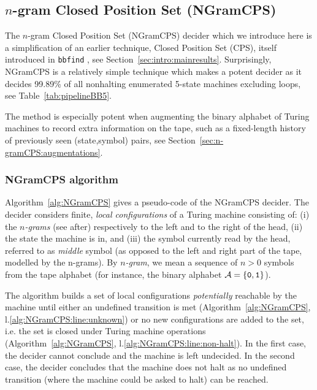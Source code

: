 
\newpage


\newcommand{\ngramcps}{NGramCPS\xspace}

\subsection{$n$-gram Closed Position Set (\ngramcps)}\label{sec:n-gramCPS}

The $n$-gram Closed Position Set (\ngramcps) decider which we introduce here is a simplification of an earlier technique, Closed Position Set (CPS), itself introduced in \texttt{bbfind} \cite{Skelet_bbfind}, see Section~\ref{sec:intro:mainresults}. Surprisingly, \ngramcps is a relatively simple technique which makes a potent decider as it decides 99.89\% of all nonhalting enumerated 5-state machines excluding loops, see Table~\ref{tab:pipelineBB5}.

The method is especially potent when augmenting the binary alphabet of Turing machines to record extra information on the tape, such as a fixed-length history of previously seen (state,symbol) pairs, see Section~\ref{sec:n-gramCPS:augmentations}.

\subsubsection{\ngramcps algorithm}\label{sec:n-gramCPS:algo}

Algorithm~\ref{alg:NGramCPS} gives a pseudo-code of the \ngramcps decider. The decider considers finite, \textit{local configurations} of a Turing machine consisting of: (i) the \textit{$n$-grams} (see after) respectively to the left and to the right of the head, (ii) the state the machine is in, and (iii) the symbol currently read by the head, referred to as \textit{middle} symbol (as opposed to the left and right part of the tape, modelled by the n-grams). By \textit{$n$-gram}, we mean a sequence of $n > 0$ symbols from the tape alphabet (for instance, the binary alphabet $\mathcal{A}=\{\texttt{0},\texttt{1}\}$).

The algorithm builds a set of local configurations \textit{potentially} reachable by the machine until either an undefined transition is met (Algorithm~\ref{alg:NGramCPS}, l.\ref{alg:NGramCPS:line:unknown}) or no new configurations are added to the set, i.e. the set is closed under Turing machine operations (Algorithm~\ref{alg:NGramCPS}, l.\ref{alg:NGramCPS:line:non-halt}). In the first case, the decider cannot conclude and the machine is left undecided. In the second case, the decider concludes that the machine does not halt as no undefined transition (\ie where the machine could be asked to halt) can be reached.

